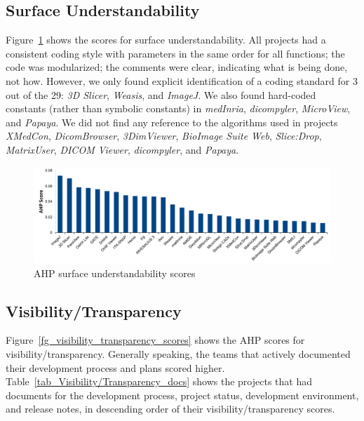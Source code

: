 \documentclass[final, 3p, times, authoryear]{elsarticle}
\begin{document}
\subsection{Surface Understandability} \label{sec_result_understandability}

Figure~\ref{fg_surface_understandability_scores} shows the scores for surface
understandability. All projects had a consistent coding style with parameters in
the same order for all functions; the code was modularized; the comments were
clear, indicating what is being done, not how. However, we only found explicit
identification of a coding standard for 3 out of the 29: \textit{3D Slicer},
\textit{Weasis}, and \textit{ImageJ}. We also found hard-coded constants (rather
than symbolic constants) in \textit{medInria}, \textit{dicompyler},
\textit{MicroView}, and \textit{Papaya}. We did not find any reference to the
algorithms used in projects \textit{XMedCon}, \textit{DicomBrowser},
\textit{3DimViewer}, \textit{BioImage Suite Web}, \textit{Slice:Drop},
\textit{MatrixUser}, \textit{DICOM Viewer}, \textit{dicompyler}, and
\textit{Papaya}. 

\begin{figure}[!ht]
\includegraphics[scale=0.48]{figures/understandability_scores.pdf}
\caption{AHP surface understandability scores}
\label{fg_surface_understandability_scores}
\end{figure}

\subsection{Visibility/Transparency} \label{sec_result_visibility_transparency}

Figure~\ref{fg_visibility_transparency_scores} shows the AHP scores for
visibility/transparency. Generally speaking, the teams that actively documented
their development process and plans scored higher.
Table~\ref{tab_Visibility/Transparency_docs} shows the projects that had
documents for the development process, project status, development environment,
and release notes, in descending order of their visibility/transparency
scores.
\end{document}
